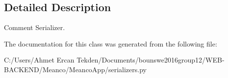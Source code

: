\subsection{Detailed Description}
Comment Serializer. 

The documentation for this class was generated from the following file\+:\begin{DoxyCompactItemize}
\item 
C\+:/\+Users/\+Ahmet Ercan Tekden/\+Documents/bounswe2016group12/\+W\+E\+B-\/\+B\+A\+C\+K\+E\+N\+D/\+Meanco/\+Meanco\+App/serializers.\+py\end{DoxyCompactItemize}
